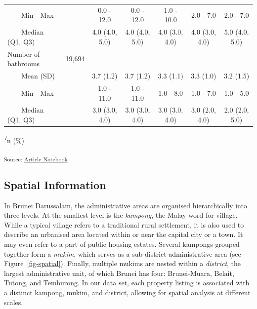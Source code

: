 \documentclass[
  number]{elsarticle}
\begin{document}
\begin{landscape}
\begin{table}
{\begin{tabular*}{\linewidth}{@{\extracolsep{\fill}}lcccccc}
    Min - Max &  & 0.0 - 12.0 & 0.0 - 12.0 & 1.0 - 10.0 & 2.0 - 7.0 & 2.0 - 7.0 \\ 
    Median (Q1, Q3) &  & 4.0 (4.0, 5.0) & 4.0 (4.0, 5.0) & 4.0 (3.0, 4.0) & 4.0 (3.0, 4.0) & 5.0 (4.0, 5.0) \\ 
Number of bathrooms & 19,694 &  &  &  &  &  \\ 
    Mean (SD) &  & 3.7 (1.2) & 3.7 (1.2) & 3.3 (1.1) & 3.3 (1.0) & 3.2 (1.5) \\ 
    Min - Max &  & 1.0 - 11.0 & 1.0 - 11.0 & 1.0 - 8.0 & 1.0 - 7.0 & 1.0 - 5.0 \\ 
    Median (Q1, Q3) &  & 3.0 (3.0, 4.0) & 3.0 (3.0, 4.0) & 3.0 (3.0, 4.0) & 3.0 (2.0, 4.0) & 2.0 (2.0, 5.0) \\ 
\bottomrule
\end{tabular*}
\begin{minipage}{\linewidth}
\textsuperscript{\textit{1}}n (\%)\\
\end{minipage}

\textsubscript{Source:
\href{https://Bruneiverse.github.io/house-data/manuscript-preview.html}{Article
Notebook}}

}

\end{table}%

\end{landscape}

\subsection{Spatial Information}\label{spatial-information}

In Brunei Darussalam, the administrative areas are organised
hierarchically into three levels. At the smallest level is the
\emph{kampong}, the Malay word for village. While a typical village
refers to a traditional rural settlement, it is also used to describe an
urbanised area located within or near the capital city or a town. It may
even refer to a part of public housing estates. Several kampongs grouped
together form a \emph{mukim}, which serves as a sub-district
administrative area (see Figure~\ref{fig-spatial}). Finally, multiple
mukims are nested within a \emph{district}, the largest administrative
unit, of which Brunei has four: Brunei-Muara, Belait, Tutong, and
Temburong. In our data set, each property listing is associated with a
distinct kampong, mukim, and district, allowing for spatial analysis at
different scales.
\end{document}
